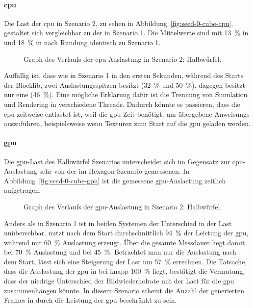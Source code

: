 \paragraph{\ac{cpu}} Die Last der \ac{cpu} in Szenario 2, zu sehen in Abbildung~\vref{fig:seed-0-cube-cpu}, gestaltet sich vergleichbar zu der in Szenario 1. Die Mittelwerte sind mit \SI{13}{\percent} in \sysA{} und \SI{18}{\percent} in \sysB{} nach Rundung identisch zu Szenario 1.
\begin{figure}[!htb]
	\caption[Graph des Verlaufs der -Auslastung in Szenario 2: Halbwürfel.]{Graph des Verlaufs der \ac{cpu}-Auslastung in Szenario 2: Halbwürfel.}\label{fig:seed-0-cube-cpu}
\end{figure}
Auffällig ist, dass \sysB{} wie in Szenario 1 in den ersten Sekunden, während des Starts der Blocklib, zwei Auslastungsspitzen besitzt (\SI{32}{\percent} und \SI{50}{\percent}). \sysA{} dagegen besitzt nur eine (\SI{46}{\percent}). Eine mögliche Erklärung dafür ist die Trennung von Simulation und Rendering in verschiedene Threads. Dadurch könnte es passieren, dass die \ac{cpu} zeitweise  entlastet ist, weil die \ac{gpu} Zeit benötigt, um übergebene \glspl{Anweisung} auszuführen, beispielsweise wenn Texturen zum Start auf die \ac{gpu} geladen werden.

\paragraph{\ac{gpu}} Die \ac{gpu}-Last des Halbwürfel Szenarios unterscheidet sich im Gegensatz zur \ac{cpu}-Auslastung sehr von der im Hexagon-Szenario gemessenen. In Abbildung~\vref{fig:seed-0-cube-gpu} ist die gemessene \ac{gpu}-Auslastung zeitlich aufgetragen. 
\begin{figure}[!htb]
	\caption[Graph des Verlaufs der -Auslastung in Szenario 2: Halbwürfel.]{Graph des Verlaufs der \ac{gpu}-Auslastung in Szenario 2: Halbwürfel.}\label{fig:seed-0-cube-gpu}
\end{figure}

Anders als in Szenario 1 ist in beiden Systemen der Unterschied in der Last unübersehbar. \sysB{} nutzt nach dem Start durchschnittlich \SI{94}{\percent} der Leistung der \ac{gpu}, während \sysA{} nur \SI{60}{\percent} Auslastung erzeugt. Über die gesamte Messdauer liegt \sysB{} damit bei \SI{70}{\percent} Auslastung und \sysA{} bei \SI{45}{\percent}. Betrachtet man nur die Auslastung nach dem Start, lässt sich eine Steigerung der Last um \SI{57}{\percent} errechnen. Die Tatsache, dass die Auslastung der \ac{gpu} in \sysB{} bei knapp \SI{100}{\percent} liegt, bestätigt die Vermutung, dass der niedrige Unterschied der Bildwiederholrate mit der Last für die \ac{gpu} zusammenhängen könnte. In diesem Szenario scheint die Anzahl der generierten Frames in \sysB{} durch die Leistung der \ac{gpu} beschränkt zu sein. 


